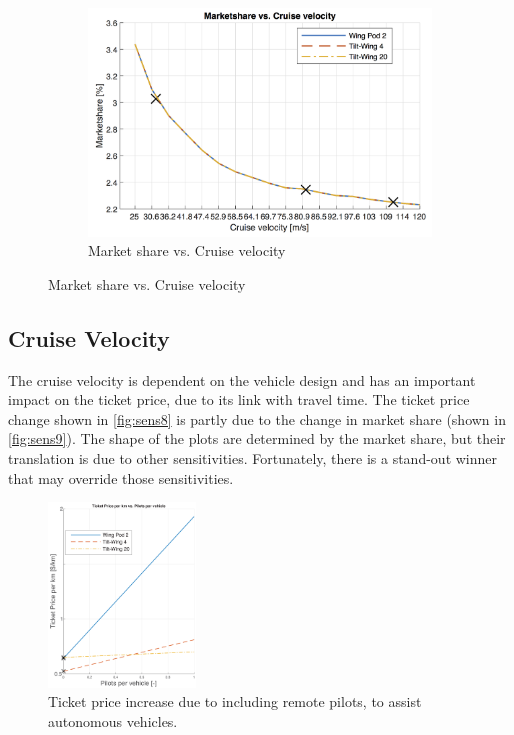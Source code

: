 \begin{figure}[h]
\begin{subfigure}[t]{0.33\textwidth}
    \includegraphics[width=\textwidth]{Figures/cruise_marketshare.png}
    \captionsetup{justification=centering}
    \caption{Market share vs. Cruise velocity}
    \label{fig:sens9}
\end{subfigure}
\captionsetup{justification=centering}
\end{figure}

\subsection{Cruise Velocity}
The cruise velocity is dependent on the vehicle design and has an important impact on the ticket price, due to its link with travel time. The ticket price change shown in \autoref{fig:sens8} is partly due to the change in market share (shown in \autoref{fig:sens9}). The shape of the plots are determined by the market share, but their translation is due to other sensitivities. Fortunately, there is a stand-out winner that may override those sensitivities.


\begin{figure}[h]%
    \centering
    \includegraphics[width=0.35\textwidth]{Figures/autonomous_TPrice_perkm.png}
    \captionsetup{justification=centering}
    \caption{Ticket price increase due to including remote pilots, to assist autonomous vehicles.}
\label{fig:autocost}
\end{figure}


